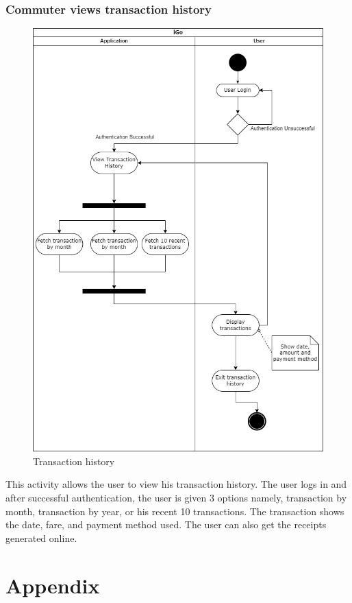 \documentclass{article}
\begin{document}
 \subsubsection{Commuter views transaction history}
    \begin{figure}[h]
        \centering
        \includegraphics[scale=0.25]{transaction_history_activity.jpg}
        \caption{Transaction history}
        \label{fig:history}
    \end{figure}
    This activity allows the user to view his transaction history. The user logs in and after successful authentication, the user is given 3 options namely, transaction by month, transaction by year, or his recent 10 transactions. The transaction shows the date, fare, and payment method used. The user can also get the receipts generated online. 
\pagebreak
 \section{Appendix} \label{Appendix}
\end{document}
